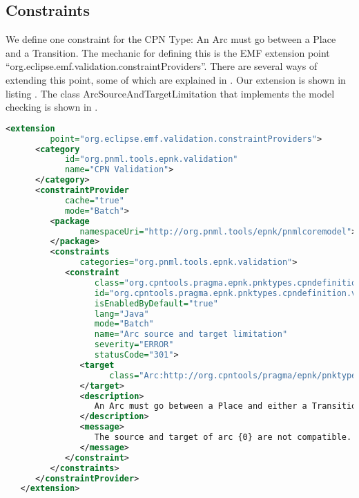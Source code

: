 \subsection{Constraints}

We define one constraint for the CPN Type: An Arc must go between a Place and a
Transition. The mechanic for defining this is the EMF extension point
``org.eclipse.emf.validation.constraintProviders''. There are several ways of
extending this point, some of which are explained in \cite{kindler2011epnk}. Our
extension is shown in listing . The class
ArcSourceAndTargetLimitation that implements the model checking is shown in
.

\begin{lstlisting}[language=XML,label=lst:constraintextension,float,
caption=constraintProvider extension] 
   <extension
         point="org.eclipse.emf.validation.constraintProviders">
      <category
            id="org.pnml.tools.epnk.validation"
            name="CPN Validation">
      </category>
      <constraintProvider
            cache="true"
            mode="Batch">
         <package
               namespaceUri="http://org.pnml.tools/epnk/pnmlcoremodel">
         </package>
         <constraints
               categories="org.pnml.tools.epnk.validation">
            <constraint
                  class="org.cpntools.pragma.epnk.pnktypes.cpndefinition.validation.ArcSourceAndTargetLimitation"
                  id="org.cpntools.pragma.epnk.pnktypes.cpndefinition.validation.ArcSourceAndTargetLimitation"
                  isEnabledByDefault="true"
                  lang="Java"
                  mode="Batch"
                  name="Arc source and target limitation"
                  severity="ERROR"
                  statusCode="301">
               <target
                     class="Arc:http://org.cpntools/pragma/epnk/pnktypes/cpndefinition">
               </target>
               <description>
                  An Arc must go between a Place and either a Transition or a Page.
               </description>
               <message>
                  The source and target of arc {0} are not compatible.
               </message>
            </constraint>
         </constraints>
      </constraintProvider>
   </extension>
\end{lstlisting}

